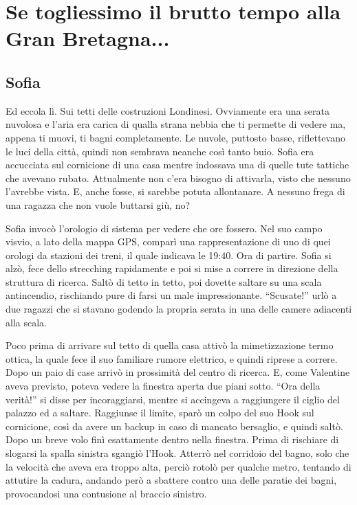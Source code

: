 \chapter{Se togliessimo il brutto tempo alla Gran Bretagna...}

  \section*{Sofia}
    
    Ed eccola lì. Sui tetti delle costruzioni Londinesi. Ovviamente era una serata nuvolosa e l'aria era carica di qualla
    strana nebbia che ti permette di vedere ma, appena ti muovi, ti bagni completamente. Le nuvole, puttosto basse,
    riflettevano le luci della città, quindi non sembrava neanche così tanto buio. Sofia era accucciata sul
    cornicione di una casa mentre indossava una di quelle tute tattiche che avevano rubato. Attualmente non c'era
    bisogno di attivarla, visto che nessuno l'avrebbe vista. E, anche fosse, si sarebbe potuta allontanare. A nessuno
    frega di una ragazza che non vuole buttarsi giù, no?

    Sofia invocò l'orologio di sistema per vedere che ore fossero. Nel suo campo visvio, a lato della mappa GPS, comparì
    una rappresentazione di uno di quei orologi da stazioni dei treni, il quale indicava le 19:40. Ora di partire. Sofia
    si alzò, fece dello strecching rapidamente e poi si mise a correre in direzione della struttura di ricerca. Saltò di
    tetto in tetto, poi dovette saltare su una scala antincendio, rischiando pure di farsi un male impressionante.
    ``Scusate!'' urlò a due ragazzi che si stavano godendo la propria serata in una delle camere adiacenti alla scala.

    Poco prima di arrivare sul tetto di quella casa attivò la mimetizzazione termo ottica, la quale fece il suo
    familiare rumore elettrico, e quindi riprese a correre. Dopo un paio di case arrivò in prossimità del centro di
    ricerca. E, come Valentine aveva previsto, poteva vedere la finestra aperta due piani sotto. ``Ora della verità!''
    si disse per incoraggiarsi, mentre si accingeva a raggiungere il ciglio del palazzo ed a saltare. Raggiunse il
    limite, sparò un colpo del suo Hook sul cornicione, così da avere un backup in caso di mancato bersaglio, e quindi
    saltò. Dopo un breve volo finì esattamente dentro nella finestra. Prima di rischiare di slogarsi la spalla sinistra
    sgangiò l'Hook. Atterrò nel corridoio del bagno, solo che la velocità che aveva era troppo alta, perciò rotolò per
    qualche metro, tentando di attutire la cadura, andando però a sbattere contro una delle paratie dei bagni,
    provocandosi una contusione al braccio sinistro.

